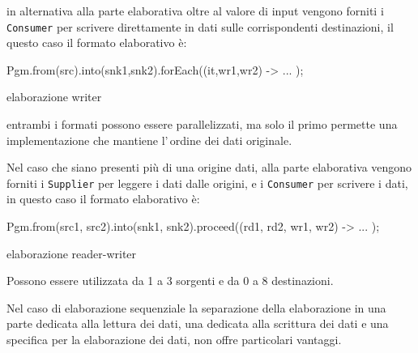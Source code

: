 in alternativa alla parte elaborativa oltre al valore di input vengono forniti i
\texttt{Consumer} per scrivere direttamente in dati sulle corrispondenti
destinazioni, il questo caso il formato elaborativo è:
\begin{elisting}[!htb]
\begin{javacode}
    Pgm.from(src).into(snk1,snk2).forEach((it,wr1,wr2) -> { ... });
\end{javacode}
\caption{elaborazione writer}
\label{lst:processWriter}
\end{elisting}
entrambi i formati possono essere parallelizzati, ma solo il primo permette una
implementazione che mantiene l'\,ordine dei dati originale.

Nel caso che siano presenti più di una origine dati, alla parte elaborativa
vengono forniti i \texttt{Supplier} per leggere i dati dalle origini, e i
\texttt{Consumer} per scrivere i dati, in questo caso il formato elaborativo è:
\begin{elisting}[!htb]
\begin{javacode}
    Pgm.from(src1, src2).into(snk1, snk2).proceed((rd1, rd2, wr1, wr2) -> { ... });
\end{javacode}
\caption{elaborazione reader-writer}
\label{lst:pullProcess}
\end{elisting}


Possono essere utilizzata da 1 a 3 sorgenti e da 0 a 8 destinazioni.

Nel caso di elaborazione sequenziale la separazione della elaborazione in una
parte dedicata alla lettura dei dati, una dedicata alla scrittura dei dati e una
specifica per la elaborazione dei dati, non offre particolari vantaggi.

